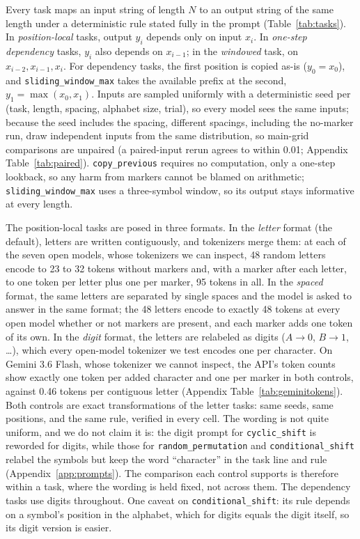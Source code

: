 \documentclass[10pt]{article} %
\newcommand{\task}[1]{\texttt{#1}}
\begin{document}
Every task maps an input string of length $N$ to an output string of the same length under a deterministic rule stated fully in the prompt (Table~\ref{tab:tasks}). In \emph{position-local} tasks, output $y_i$ depends only on input $x_i$. In \emph{one-step dependency} tasks, $y_i$ also depends on $x_{i-1}$; in the \emph{windowed} task, on $x_{i-2}, x_{i-1}, x_i$. For dependency tasks, the first position is copied as-is ($y_0 = x_0$), and \task{sliding\_window\_max} takes the available prefix at the second, $y_1 = \max(x_0, x_1)$. Inputs are sampled uniformly with a deterministic seed per (task, length, spacing, alphabet size, trial), so every model sees the same inputs; because the seed includes the spacing, different spacings, including the no-marker run, draw independent inputs from the same distribution, so main-grid comparisons are unpaired (a paired-input rerun agrees to within 0.01; Appendix Table~\ref{tab:paired}). \task{copy\_previous} requires no computation, only a one-step lookback, so any harm from markers cannot be blamed on arithmetic; \task{sliding\_window\_max} uses a three-symbol window, so its output stays informative at every length.

The position-local tasks are posed in three formats. In the \emph{letter} format (the default), letters are written contiguously, and tokenizers merge them: at each of the seven open models, whose tokenizers we can inspect, 48 random letters encode to 23 to 32 tokens without markers and, with a marker after each letter, to one token per letter plus one per marker, 95 tokens in all. In the \emph{spaced} format, the same letters are separated by single spaces and the model is asked to answer in the same format; the 48 letters encode to exactly 48 tokens at every open model whether or not markers are present, and each marker adds one token of its own. In the \emph{digit} format, the letters are relabeled as digits ($A \to 0$, $B \to 1$, \dots), which every open-model tokenizer we test encodes one per character. On Gemini 3.6 Flash, whose tokenizer we cannot inspect, the API's token counts show exactly one token per added character and one per marker in both controls, against 0.46 tokens per contiguous letter (Appendix Table~\ref{tab:geminitokens}). Both controls are exact transformations of the letter tasks: same seeds, same positions, and the same rule, verified in every cell. The wording is not quite uniform, and we do not claim it is: the digit prompt for \task{cyclic\_shift} is reworded for digits, while those for \task{random\_permutation} and \task{conditional\_shift} relabel the symbols but keep the word ``character'' in the task line and rule (Appendix~\ref{app:prompts}). The comparison each control supports is therefore within a task, where the wording is held fixed, not across them. The dependency tasks use digits throughout. One caveat on \task{conditional\_shift}: its rule depends on a symbol's position in the alphabet, which for digits equals the digit itself, so its digit version is easier.
\end{document}
